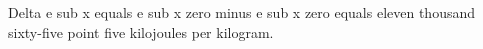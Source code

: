 Delta e sub x equals e sub x zero minus e sub x zero equals eleven thousand sixty-five point five kilojoules per kilogram.